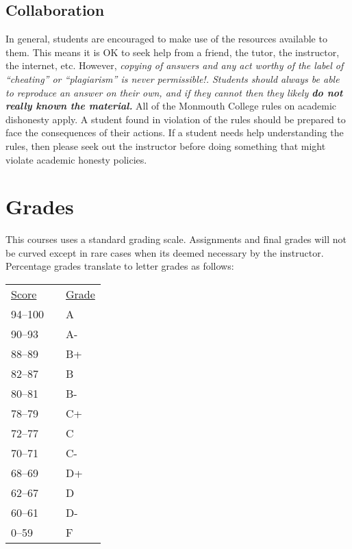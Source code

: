 \documentclass[10pt]{article}
\begin{document}
\subsection{Collaboration}

In general, students are encouraged to make use of the resources available to them.  This means it is OK to seek help from a friend, the tutor, the instructor, the internet, etc.  However, \textit{copying of answers and any act worthy of the label of ``cheating'' or ``plagiarism'' is never permissible!. Students should always be able to reproduce an answer on their own, and if they cannot then they likely \textbf{do not really known the material.}} All of the Monmouth College rules on academic dishonesty apply.  A student found in violation of the rules should be prepared to face the consequences of their actions. If a student needs help understanding the rules, then please seek out the instructor before doing something that might violate academic honesty policies.

\section{Grades}

This courses uses a standard grading scale.  Assignments and final grades will not be curved except in rare cases when its deemed necessary by the instructor.  Percentage grades translate to letter grades as follows:

\begin{center}
\begin{small}
\begin{tabular}{lcl}
\underline{Score} & & \underline{Grade} \\
94--100 & & A \\
90--93 & & A- \\
88--89 & & B+ \\
82--87 & & B \\
80--81 & & B- \\
78--79 & & C+ \\
72--77 & & C \\
70--71 & & C- \\
68--69 & & D+ \\
62--67 & & D \\
60--61 & & D- \\
0--59 & & F
\end{tabular}
\end{small}
\end{center}
\end{document}
